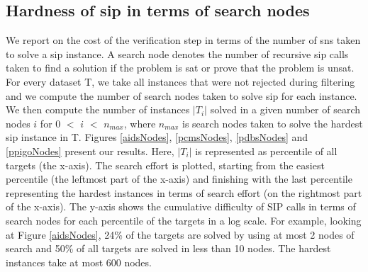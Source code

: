 \documentclass{l4proj}
\newcounter{example}[section]
\begin{document}
\subsection{Hardness of \gls{sip} in terms of search nodes}
We report on the cost of the verification step in terms of the number of \glspl{sn} taken to solve a \gls{sip} instance. A search node denotes the number of recursive \gls{sip} calls taken to find a solution if the problem is \gls{sat} or prove that the problem is \gls{unsat}. For every dataset T, we take all instances that were not rejected during filtering and we compute the number of search nodes taken to solve \gls{sip} for each instance. We then compute the number of instances $|T_i|$ solved in a given number of search nodes $i$ for $0$ $<$ $i$ $<$ $n_{max}$, where  $n_{max}$ is search nodes taken to solve the hardest \gls{sip} instance in T. Figures \ref{aidsNodes}, \ref{pcmsNodes}, \ref{pdbsNodes} and \ref{ppigoNodes} present our results. Here, $|T_i|$ is represented as percentile of all targets (the x-axis). The search effort is plotted, starting from the easiest percentile (the leftmost part of the x-axis) and finishing with the last percentile representing the hardest instances in terms of search effort (on the rightmost part of the x-axis). The y-axis shows the cumulative difficulty of SIP calls in terms of search nodes for each percentile of the targets in a log scale. For example, looking at Figure \ref{aidsNodes}, 24\% of the targets are solved by using at most 2 nodes of search and 50\% of all targets are solved in less than 10 nodes. The hardest instances take at most 600 nodes.
\end{document}
